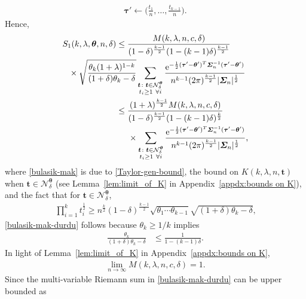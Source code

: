 \documentclass[journal, 10pt]{IEEEtran}
\newcommand{\rme}{\mathrm{e}}
\newcommand{\cN}{\mathcal{N}}
\theoremstyle{plain}
\theoremstyle{plain}
\theoremstyle{plain}
\theoremstyle{plain}
\newcommand{\boldtheta}{\mathbold{\theta}}
\newcommand{\boldtau}{\mathbold{\tau}}
\newcommand{\boldt}{\mathbold{t}}
\begin{document}
\begin{appendices}
\begin{IEEEproof}
\begin{align}
	\boldtau'\leftarrow \big( \tfrac{t_1}{n}, \hdots, \tfrac{t_{k-1}}{n} \big)\text{.}
\end{align}
Hence,
\begin{align}
	S_1(k, \lambda, \boldtheta, n, \delta) &\le \frac{M(k, \lambda, n, c, \delta)}{(1-\delta)^{\frac{k-1}{2}}(1-(k-1)\delta)^{\frac{k-1}{2}}} \label{bulasik-mak}    \\ 
	& \hspace{-20mm} \times\sqrt{\frac{\theta_k (1+\lambda)^{1-k} }{(1+\delta) \theta_k-\delta}}  \sum_{\substack{ \boldt \colon \boldt \in \cN_\delta^\boldtheta  \\ t_i\ge 1 \ \forall i }} \frac{\rme^{-\frac{1}{2}(\boldtau'-\boldtheta')^T \mathbold{\Sigma}_n^{-1}(\boldtau'-\boldtheta') }}{n^{k-1}(2\pi)^{\frac{k-1}{2}} |\mathbold{\Sigma}_n|^\frac{1}{2}} \nonumber \\
	&\le \frac{(1+\lambda)^{\frac{k-1}{2}} M(k, \lambda, n, c, \delta)}{(1-\delta)^{\frac{k-1}{2}}(1-(k-1)\delta)^{\frac{k}{2}}}\label{bulasik-mak-durdu} \\
	& \hspace{5mm} \times \sum_{\substack{ \boldt \colon \boldt \in \cN_\delta^\boldtheta   \\ t_i\ge 1 \ \forall i }} \frac{\rme^{-\frac{1}{2}(\boldtau'-\boldtheta')^T \mathbold{\Sigma}_n^{-1}(\boldtau'-\boldtheta') }}{n^{k-1}(2\pi)^{\frac{k-1}{2}} |\mathbold{\Sigma}_n|^\frac{1}{2}}\text{,}  \nonumber
\end{align}
where \eqref{bulasik-mak} is due to \eqref{Taylor-gen-bound}, the bound on $K(k,\lambda, n, \boldt)$ when $\boldt \in \cN_\delta^\boldtheta$ (see Lemma~\ref{lem:limit_of_K} in Appendix~\ref{appdx:bounds on K}), and the fact that for $\boldt \in \cN_\delta^\boldtheta$, 
\begin{align}
	\prod_{i=1}^k  t_i^{\frac12} \ge n^{\frac k2} (1-\delta)^{\frac{k-1}{2}} \sqrt{\theta_1 \cdots \theta_{k-1} }\sqrt{(1+\delta)\theta_k-\delta}\text{,}  
\end{align}  
\eqref{bulasik-mak-durdu} follows because $\theta_k \ge 1/k $ implies
\begin{align}
	\frac{\theta_k}{(1+\delta)\theta_k-\delta} &\le \frac{1}{1-(k-1)\delta} \text{.}
\end{align}
In light of Lemma~\ref{lem:limit_of_K} in Appendix~\ref{appdx:bounds on K},
\begin{align}
	\lim_{n\to \infty} M(k, \lambda, n, c, \delta)=1\text{.}
\end{align}
Since the multi-variable Riemann sum in \eqref{bulasik-mak-durdu} can be upper bounded as

\end{IEEEproof}
\end{appendices}
\end{document}
